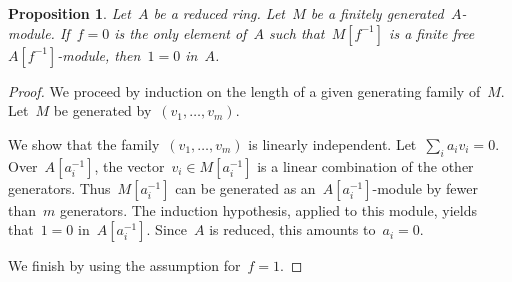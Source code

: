 \documentclass{amsart}
\theoremstyle{definition}
\theoremstyle{plain}
\newtheorem{prop}[defn]{Proposition}
\theoremstyle{remark}
\begin{document}
\begin{prop}Let~$A$ be a reduced ring. Let~$M$ be a finitely
generated~$A$-module. If~$f = 0$ is the only element of~$A$ such
that~$M[f^{-1}]$ is a finite free~$A[f^{-1}]$-module, then~$1 = 0$ in~$A$.
\end{prop}

\begin{proof}We proceed by induction on the length of a given generating family
of~$M$. Let~$M$ be generated by~$(v_1,\ldots,v_m)$.

We show that the family~$(v_1,\ldots,v_m)$ is linearly independent. Let~$\sum_i
a_i v_i = 0$. Over~$A[a_i^{-1}]$, the vector~$v_i \in M[a_i^{-1}]$ is a linear
combination of the other generators. Thus~$M[a_i^{-1}]$ can be generated as
an~$A[a_i^{-1}]$-module by fewer than~$m$ generators. The induction hypothesis,
applied to this module, yields that~$1 = 0$ in~$A[a_i^{-1}]$. Since~$A$ is
reduced, this amounts to~$a_i = 0$.

We finish by using the assumption for~$f = 1$.
\end{proof}

\printbibliography
\end{document}
